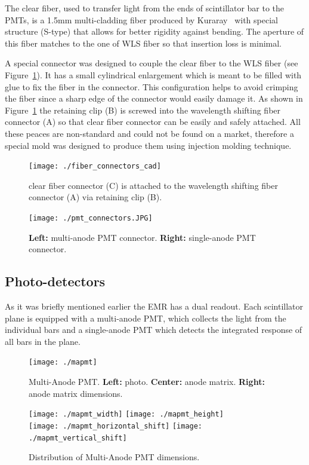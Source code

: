 \documentclass[a4paper,11pt]{article}
\begin{document}
The clear fiber, used to transfer light from the ends of scintillator bar to the PMTs, is a 1.5mm multi-cladding fiber produced by 
Kuraray~\cite{kuraray} with special structure (S-type) that allows for better rigidity against bending. The aperture of this fiber matches
to the one of WLS fiber so that insertion loss is minimal.

A special connector was designed to couple the clear fiber to the WLS fiber (see Figure~\ref{fig:fiber_connectors_cad}). It has a small
cylindrical enlargement which is meant to be filled with glue to fix the fiber in the connector. This configuration helps
to avoid crimping the fiber since a sharp edge of the connector would easily damage it. As shown in Figure~\ref{fig:fiber_connectors_cad}
the retaining clip (B) is screwed into the wavelength shifting fiber connector (A) so that clear fiber connector can be easily and safely
attached. All these peaces are non-standard and could not be found on a market, therefore a special mold was designed to produce them using
injection molding technique. 

\begin{figure}[htp!]
 \centering
 \texttt{[image: ./fiber\_connectors\_cad]}
 \caption[Clear fiber connector]{clear fiber connector (C) is attached to the wavelength shifting fiber connector (A) via retaining clip (B).}
 \label{fig:fiber_connectors_cad}
\end{figure}

\begin{figure}[htp!]
 \centering
 \texttt{[image: ./pmt\_connectors.JPG]}
 \caption[PMT connectors]{{\bf Left:} multi-anode PMT connector. {\bf Right:} single-anode PMT connector.}
 \label{fig:pmt_connectors}
\end{figure}

\subsection{Photo-detectors}
As it was briefly mentioned earlier the EMR has a dual readout. Each scintillator plane is equipped with a multi-anode PMT, which collects
the light from the individual bars and a single-anode PMT which detects the integrated response of all bars in the plane. 
\begin{figure}[h]
 \centering
 \texttt{[image: ./mapmt]}
 \caption[Multi-Anode PMT]{Multi-Anode PMT. {\bf Left:} photo. {\bf Center:} anode matrix. {\bf Right:} anode matrix dimensions.}
 \label{fig:mapmt}
\end{figure}
\begin{figure}[h]
 \centering
 \texttt{[image: ./mapmt\_width]}
 \texttt{[image: ./mapmt\_height]}\\
 \texttt{[image: ./mapmt\_horizontal\_shift]}
 \texttt{[image: ./mapmt\_vertical\_shift]}
 \caption[Distribution of Multi-Anode PMT dimensions]{Distribution of Multi-Anode PMT dimensions.}
 \label{fig:mapmt_dimensions}
\end{figure}
\end{document}
